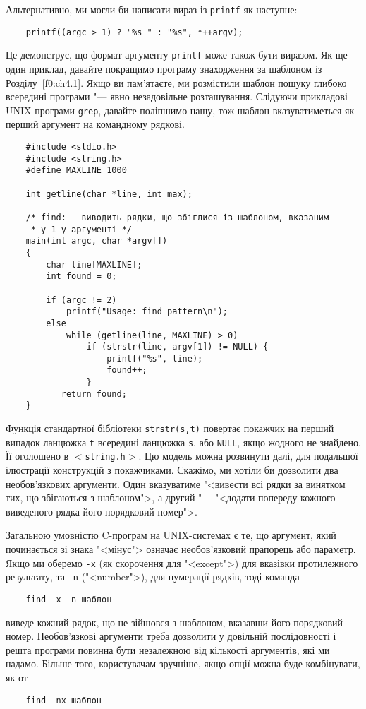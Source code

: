 \documentclass[a4paper,12pt]{book}
\begin{document}
  Альтернативно, ми могли би написати вираз із \texttt{printf} як наступне:
  \begin{verbatim}
    printf((argc > 1) ? "%s " : "%s", *++argv);
  \end{verbatim}

  Це демонструє, що формат аргументу \texttt{printf} може також бути виразом. Як ще один
  приклад, давайте покращимо програму знаходження за шаблоном із Розділу~\ref{f0:ch4.1}. 
  Якщо ви пам'ятаєте, ми розмістили шаблон пошуку глибоко всередині програми
  "--- явно незадовільне розташування. Слідуючи прикладові UNIX-програми \texttt{grep},
  давайте поліпшимо нашу, тож шаблон вказуватиметься як перший аргумент на командному
  рядкові.

  \begin{verbatim}
    #include <stdio.h>
    #include <string.h>
    #define MAXLINE 1000

    int getline(char *line, int max);

    /* find:   виводить рядки, що збіглися із шаблоном, вказаним
     * у 1-у аргументі */
    main(int argc, char *argv[])
    {
        char line[MAXLINE];
        int found = 0;

        if (argc != 2)
            printf("Usage: find pattern\n");
        else
            while (getline(line, MAXLINE) > 0)
                if (strstr(line, argv[1]) != NULL) {
                    printf("%s", line);
                    found++;
                }
           return found;
    }
  \end{verbatim}

  Функція стандартної бібліотеки \texttt{strstr(s,t)} повертає покажчик на перший випадок
  ланцюжка \texttt{t} всередині ланцюжка \texttt{s}, або \texttt{NULL}, якщо жодного не
  знайдено. Її оголошено в \texttt{\mbox{$<$}string.h\mbox{$>$}}. Цю модель можна
  розвинути далі, для подальшої ілюстрації конструкцій з покажчиками. Скажімо, ми хотіли
  би дозволити два необов'язкових аргументи. Один вказуватиме "<вивести всі рядки за
  винятком тих, що збігаються з шаблоном">, а другий "--- "<додати попереду кожного
  виведеного рядка його порядковий номер">.

  Загальною умовністю C-програм на UNIX-системах є те, що аргумент, який починається зі
  знака "<мінус"> означає необов'язковий прапорець або параметр. Якщо ми оберемо
  \texttt{-x} (як скорочення для "<except">) для вказівки протилежного
  результату, та \texttt{-n} ("<number">), для нумерації рядків, тоді команда
  \begin{verbatim}
    find -x -n шаблон
  \end{verbatim}
  виведе кожний рядок, що не зійшовся з шаблоном, вказавши його порядковий номер.
  Необов'язкові аргументи треба дозволити у довільній послідовності і решта програми
  повинна бути незалежною від кількості аргументів, які ми надамо. Більше того,
  користувачам зручніше, якщо опції можна буде комбінувати, як от
  \begin{verbatim}
    find -nx шаблон
  \end{verbatim}
\end{document}
